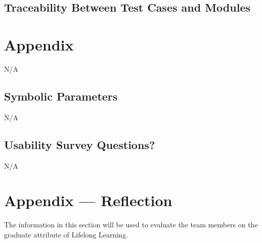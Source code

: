 \documentclass[12pt, titlepage]{article}
\begin{document}
\subsection{Traceability Between Test Cases and Modules}

				




\newpage

\section{Appendix}

N/A

\subsection{Symbolic Parameters}

N/A

\subsection{Usability Survey Questions?}

N/A

\newpage{}
\section*{Appendix --- Reflection}


The information in this section will be used to evaluate the team members on the
graduate attribute of Lifelong Learning.


\end{document}
